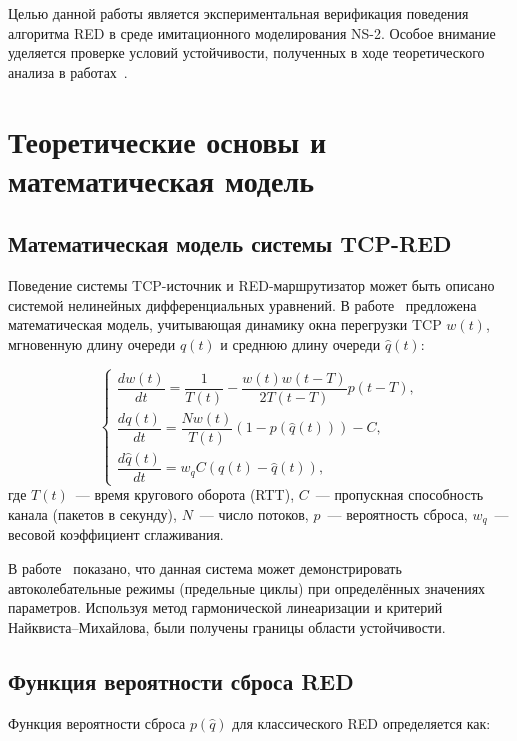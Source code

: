 \documentclass[%
]{ittmm}
\begin{document}
Целью данной работы является экспериментальная верификация поведения алгоритма RED в среде имитационного моделирования NS-2. Особое внимание уделяется проверке условий устойчивости, полученных в ходе теоретического анализа в работах~\cite{velieva2019phd}.

\section{Теоретические основы и математическая модель}

\subsection{Математическая модель системы TCP-RED}

Поведение системы TCP-источник и RED-маршрутизатор может быть описано системой нелинейных дифференциальных уравнений. В работе~\cite{korolkova2010phd} предложена математическая модель, учитывающая динамику окна перегрузки TCP $w(t)$, мгновенную длину очереди $q(t)$ и среднюю длину очереди $\hat{q}(t)$:

\begin{equation}
  \begin{cases}
    \dfrac{dw(t)}{dt} = \dfrac{1}{T(t)} - \dfrac{w(t)w(t-T)}{2T(t-T)}p(t-T), \\[6pt]
    \dfrac{dq(t)}{dt} = \dfrac{N w(t)}{T(t)} (1 - p(\hat{q}(t))) - C, \\[6pt]
    \dfrac{d\hat{q}(t)}{dt} = w_q C (q(t) - \hat{q}(t)),
  \end{cases}
  \label{eq:fluid_model}
\end{equation}
где $T(t)$~--- время кругового оборота (RTT), $C$~--- пропускная способность канала (пакетов в секунду), $N$~--- число потоков, $p$~--- вероятность сброса, $w_q$~--- весовой коэффициент сглаживания.

В работе~\cite{velieva2019phd} показано, что данная система может демонстрировать автоколебательные режимы (предельные циклы) при определённых значениях параметров. Используя метод гармонической линеаризации и критерий Найквиста--Михайлова, были получены границы области устойчивости.

\subsection{Функция вероятности сброса RED}

Функция вероятности сброса $p(\hat{q})$ для классического RED определяется как:
\end{document}
